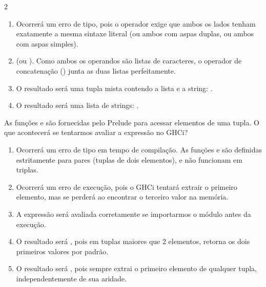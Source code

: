 \documentclass[a4paper,10pt,brazil]{article}
\begin{document}
\begin{multicols}{2}
\begin{enumerate}
  \item Ocorrerá um erro de tipo, pois o operador \haskellinline{++} exige que ambos os lados tenham exatamente a mesma sintaxe literal (ou ambos com aspas duplas, ou ambos com aspas simples).

  \item {} (ou \haskellinline{['H', 'a', 's', 'k', 'e', 'l', 'l']}). Como ambos os operandos são listas de caracteres, o operador de concatenação (\haskellinline{++}) junta as duas listas perfeitamente.

  \item O resultado será uma tupla mista contendo a lista e a string: .

  \item O resultado será uma lista de strings: \haskellinline{["Ha", "skell"]}.


\end{enumerate}

As funções  e  são fornecidas pelo Prelude para acessar elementos de uma tupla. O que acontecerá se tentarmos avaliar a expressão  no GHCi?

\begin{enumerate}
  \item Ocorrerá um erro de tipo em tempo de compilação. As funções  e  são definidas estritamente para pares (tuplas de dois elementos), e não funcionam em triplas.

  \item Ocorrerá um erro de execução, pois o GHCi tentará extrair o primeiro elemento, mas se perderá ao encontrar o terceiro valor na memória.

  \item A expressão será avaliada corretamente se importarmos o módulo  antes da execução.

  \item O resultado será , pois em tuplas maiores que 2 elementos,  retorna os dois primeiros valores por padrão.

  \item O resultado será , pois  sempre extrai o primeiro elemento de qualquer tupla, independentemente de sua aridade.


\end{enumerate}


\end{multicols}
\end{document}
